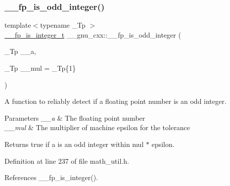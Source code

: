 \mbox{\label{namespace____gnu__cxx_adfc2607bd5aebd90ba6af2d4d4365bef}} 
\subsubsection{\texorpdfstring{\+\_\+\+\_\+fp\+\_\+is\+\_\+odd\+\_\+integer()}{\_\_fp\_is\_odd\_integer()}}
{\footnotesize\ttfamily template$<$typename \+\_\+\+Tp $>$ \\
\hyperlink{struct____gnu__cxx_1_1____fp__is__integer__t}{\+\_\+\+\_\+fp\+\_\+is\+\_\+integer\+\_\+t} \+\_\+\+\_\+gnu\+\_\+cxx\+::\+\_\+\+\_\+fp\+\_\+is\+\_\+odd\+\_\+integer (\begin{DoxyParamCaption}\item[{\+\_\+\+Tp}]{\+\_\+\+\_\+a,  }\item[{\+\_\+\+Tp}]{\+\_\+\+\_\+mul = {\ttfamily \+\_\+Tp\{1\}} }\end{DoxyParamCaption})\hspace{0.3cm}{\ttfamily [inline]}}

A function to reliably detect if a floating point number is an odd integer.


\begin{DoxyParams}{Parameters}
{\em \+\_\+\+\_\+a} & The floating point number \\
\hline
{\em \+\_\+\+\_\+mul} & The multiplier of machine epsilon for the tolerance \\
\hline
\end{DoxyParams}
\begin{DoxyReturn}{Returns}
{\ttfamily true} if a is an odd integer within mul $\ast$ epsilon. 
\end{DoxyReturn}


Definition at line 237 of file math\+\_\+util.\+h.



References \+\_\+\+\_\+fp\+\_\+is\+\_\+integer().

\mbox{\label{namespace____gnu__cxx_a8d30fc0f2348283e00f56c16d5713fc9}} 

